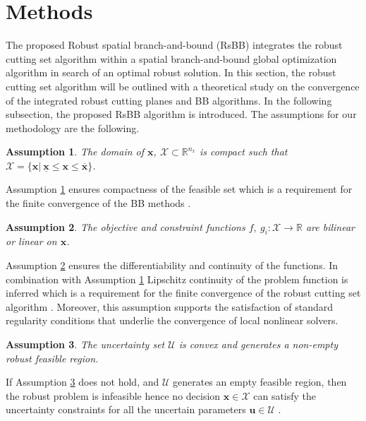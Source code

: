 \documentclass[sn-mathphys-num]{sn-jnl}
\newtheorem{assumption}{Assumption}
\begin{document}
\section{Methods}\label{meth}
The proposed Robust spatial branch-and-bound (RsBB) integrates the robust cutting set algorithm within a spatial branch-and-bound global optimization algorithm in search of an optimal robust solution. In this section, the robust cutting set algorithm \citep{Mutapcic2009} will be outlined with a theoretical study on the convergence of the integrated robust cutting planes and BB algorithms. In the following subsection, the proposed RsBB algorithm is introduced. The assumptions for our methodology are the following.
\begin{assumption}\label{as:bounded}
The domain of $\bm x$, $\mathcal{X}\subset \mathbb{R}^{n_x}$ is compact such that $\mathcal{X}=\{\bm x |~  \underline{\bm x}\leq \bm x \leq  \overline{ \bm x}\}$. 
\end{assumption}
Assumption \ref{as:bounded} ensures compactness of the feasible set which is a requirement for the finite convergence of the BB methods \citep{Belotti2013}.

\begin{assumption}\label{as:lips}
    The objective and constraint functions $f,~g_i: \mathcal{X}\rightarrow \mathbb{R}$ are bilinear or linear on $\bm x$.
\end{assumption}

Assumption \ref{as:lips} ensures the differentiability and continuity of the functions. In combination with Assumption \ref{as:bounded} Lipschitz continuity of the problem function is inferred\citep{Stein2024} which is a requirement for the finite convergence of the robust cutting set algorithm \citep{Mutapcic2009}. Moreover, this assumption supports the satisfaction of standard regularity conditions that underlie the convergence of local nonlinear solvers.

\begin{assumption}\label{as:onu}
   The uncertainty set $\mathcal{U}$ is convex and generates a non-empty robust feasible region.
\end{assumption}

If Assumption \ref{as:onu} does not hold, and $\mathcal{U}$ generates an empty feasible region, then the robust problem is infeasible hence no decision $\bm x \in \mathcal{X}$ can satisfy the uncertainty constraints for all the uncertain parameters $\bm u \in \mathcal{U}$ \citep{Bental09,Bertsimas04}.
\end{document}
